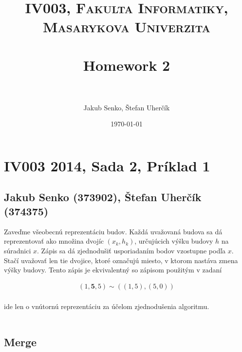 \documentclass[paper=a4, fontsize=11pt]{scrartcl} %
\title{	
\normalfont \normalsize 
\textsc{IV003, Fakulta Informatiky, Masarykova Univerzita} \\ [25pt] %
\horrule{0.5pt} \\[0.4cm] %
\huge Homework 2 \\ %
\horrule{2pt} \\[0.5cm] %
}
\author{Jakub Senko, Štefan Uherčík} %
\date{\normalsize\today} %
\numberwithin{equation}{section} %
\numberwithin{figure}{section} %
\numberwithin{table}{section} %
\begin{document}


\section*{IV003 2014, Sada 2, Príklad 1}
\subsection*{Jakub Senko (373902), Štefan Uherčík (374375)}

Zaveďme všeobecnú reprezentáciu budov. Každá uvažovaná budova sa dá reprezentovať ako množina dvojíc $(x_k, h_k)$, určujúcich výšku budovy $h$ na súradnici $x$. Zápis sa dá zjednodušiť usporiadaním bodov vzostupne podľa $x$. Stačí uvažovať len tie dvojice, ktoré označujú miesto, v ktorom nastáva zmena výšky budovy. Tento zápis je ekvivalentný so zápisom použitým v zadaní

\begin{equation}
    \begin{aligned}
        (1, \boldsymbol{5}, 5) \sim ((1, 5), (5, 0)) \\
    \end{aligned}
\end{equation}

ide len o vnútornú reprezentáciu za účelom zjednodušenia algoritmu. \\
\\

\subsection*{Merge}
\end{document}
